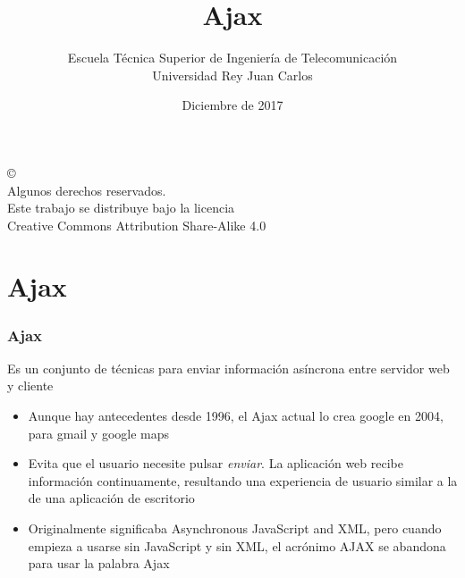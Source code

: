 \documentclass[ucs]{beamer}
\begin{document}
\title[Ajax]{Ajax}
\author[GSyC]{Escuela Técnica Superior de Ingeniería de Telecomunicación\\
Universidad Rey Juan Carlos}
\date[2017]{Diciembre de 2017}


\begin{frame}
  \titlepage
\end{frame}




\begin{frame}[b]
\begin{flushright}
{\tiny
\copyright \insertshortdate~\insertshortauthor \\
  Algunos derechos reservados. \\
  Este trabajo se distribuye bajo la licencia \\
  Creative Commons Attribution Share-Alike 4.0
}
\end{flushright}
\end{frame}



%



\section{Ajax}
\begin{frame}[fragile]
\frametitle{Ajax}

Es un conjunto de técnicas para enviar información asíncrona entre
servidor web y cliente

\begin{itemize}
\item
Aunque hay antecedentes desde 1996, el Ajax actual lo crea google en 2004, para gmail
y google maps
\item
Evita que el usuario necesite pulsar \emph{enviar}. La aplicación
web recibe información continuamente, resultando una experiencia de usuario similar
a la de una aplicación de escritorio
\item

Originalmente significaba Asynchronous JavaScript and XML, pero cuando
empieza a usarse sin JavaScript y sin XML, el acrónimo AJAX se abandona
para usar la palabra Ajax

\end{itemize}

\end{frame}
\end{document}
